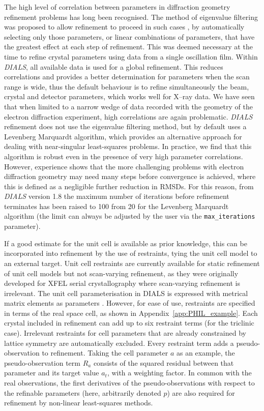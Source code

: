 \documentclass[preprint]{iucr}
\newcommand{\dials}{\emph{DIALS}\xspace}
\newcommand{\code}{\texttt}
\begin{document}
The high level of correlation between parameters in diffraction geometry
refinement problems has long been recognised. The method of eigenvalue
filtering was proposed to allow refinement to proceed in such cases
\cite{Reeke1984,LURE1986phase3}, by automatically selecting only those
parameters, or linear combinations of parameters, that have the greatest effect
at each step of refinement. This was deemed necessary at the time to refine
crystal parameters using data from a single oscillation film. Within \dials,
all available data is used for a global refinement. This reduces correlations
and provides a better determination for parameters when the scan range is wide,
thus the default behaviour is to refine simultaneously the beam, crystal and
detector parameters, which works well for X--ray data. We have seen that when
limited to a narrow wedge of data recorded with the geometry of the electron
diffraction experiment, high correlations are again problematic. \dials
refinement does not use the eigenvalue filtering method, but by default uses a
Levenberg Marquardt algorithm, which provides an alternative approach for
dealing with near-singular least-squares problems. In practice, we find that
this algorithm is robust even in the presence of very high parameter
correlations. However, experience shows that the more challenging problems with
electron diffraction geometry may need many steps before convergence is
achieved, where this is defined as a negligible further reduction in RMSDs. For
this reason, from \dials version 1.8 the maximum number of iterations before
refinement terminates has been raised to 100 from 20 for the Levenberg
Marquardt algorithm (the limit can always be adjusted by the user via the
\code{max\_iterations} parameter).

If a good estimate for the unit cell is available as prior knowledge, this can
be incorporated into refinement by the use of restraints, tying the unit cell
model to an external target. Unit cell restraints are currently available for
static refinement of unit cell models but not scan-varying refinement, as they
were originally developed for XFEL serial crystallography where scan-varying
refinement is irrelevant. The unit cell parameterisation in DIALS is expressed
with metrical matrix elements as parameters \cite{Waterman2016}. However, for
ease of use, restraints are specified in terms of the real space cell, as shown
in Appendix~\ref{app:PHIL_example}. Each crystal included in refinement can add
up to six restraint terms (for the triclinic case). Irrelevant restraints for
cell parameters that are already constrained by lattice symmetry are
automatically excluded. Every restraint term adds a pseudo-observation to
refinement. Taking the cell parameter $a$ as an example, the pseudo-observation
term $R_a$ consists of the squared residual between that parameter and its
target value $a_t$, with a weighting factor. In common with the real
observations, the first derivatives of the pseudo-observations with respect to
the refinable parameters (here, arbitrarily denoted $p$) are also required for
refinement by non-linear least-squares methods.
\end{document}
